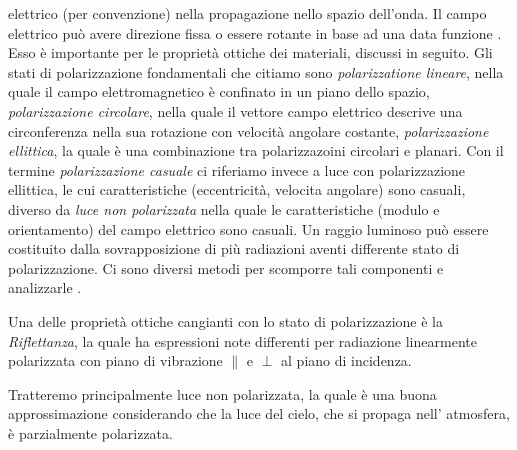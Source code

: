 elettrico (per convenzione) nella propagazione nello spazio dell'onda. Il campo elettrico pu\`o avere direzione fissa o essere rotante in base ad una
data funzione \cite{rad-phot}. Esso \`e importante per le propriet\`a ottiche dei materiali, discussi in seguito. Gli stati di polarizzazione 
fondamentali che citiamo sono \textit{polarizzatione lineare}, nella quale il campo elettromagnetico \`e confinato in un piano dello spazio, 
\textit{polarizzazione circolare}, nella quale il vettore campo elettrico descrive una circonferenza nella sua rotazione con velocit\`a angolare 
costante, \textit{polarizzazione ellittica}, la quale \`e una combinazione tra polarizzazoini circolari e planari. Con il termine 
\textit{polarizzazione casuale} ci riferiamo invece a luce con polarizzazione ellittica, le cui caratteristiche (eccentricit\`a, velocita angolare) 
sono casuali, diverso da \textit{luce non polarizzata} nella quale le caratteristiche (modulo e orientamento) del campo elettrico sono casuali.
Un raggio luminoso pu\`o essere costituito dalla sovrapposizione di pi\`u radiazioni aventi differente stato di polarizzazione. Ci sono diversi metodi 
per scomporre tali componenti e analizzarle \cite{hecht}.\par
Una delle propriet\`a ottiche cangianti con lo stato di polarizzazione \`e la \textit{Riflettanza}, la quale ha espressioni note differenti per 
radiazione linearmente polarizzata con piano di vibrazione $\parallel$ e $\perp$ al piano di incidenza.\par
Tratteremo principalmente luce non polarizzata, la quale \`e una buona approssimazione considerando che la luce del cielo, che si propaga nell'
atmosfera, \`e parzialmente polarizzata.
%
